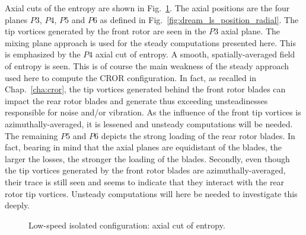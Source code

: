 Axial cuts of the entropy are shown in Fig.~\ref{fig:dream_ls_steady_entropy}.
The axial positions are the four planes $P3$, $P4$, $P5$
and $P6$ as defined in Fig.~\ref{fig:dream_ls_position_radial}.
The tip vortices generated by the front rotor are seen in the $P3$
axial plane. The mixing plane approach is used for the steady computations
presented here. This is emphasized by the $P4$ axial cut of entropy. A
smooth, spatially-averaged field of entropy is seen. This is of course the main
weakness of the steady approach used here to compute the CROR configuration.
In fact, as recalled in Chap.~\ref{cha:cror}, the tip vortices generated behind the
front rotor blades can impact the rear rotor blades and generate thus 
exceeding unsteadinesses responsible for noise and/or vibration. As the influence
of the front tip vortices is azimuthally-averaged, it is
lessened and unsteady computations will be needed.
The remaining $P5$ and $P6$ depicts the strong loading
of the rear rotor blades. In fact, bearing in mind that the
axial planes are equidistant of the blades, the larger the losses,
the stronger the loading of the blades. Secondly, even though the
tip vortices generated by the front rotor 
blades are azimuthally-averaged,
their trace is still seen and seems to indicate that they
interact with the rear rotor tip vortices. Unsteady computations will
here be needed to investigate this deeply.
\begin{figure}[htp]
  \centering
  \caption{Low-speed isolated configuration: axial cut of entropy.}
   \label{fig:dream_ls_steady_entropy}
\end{figure}